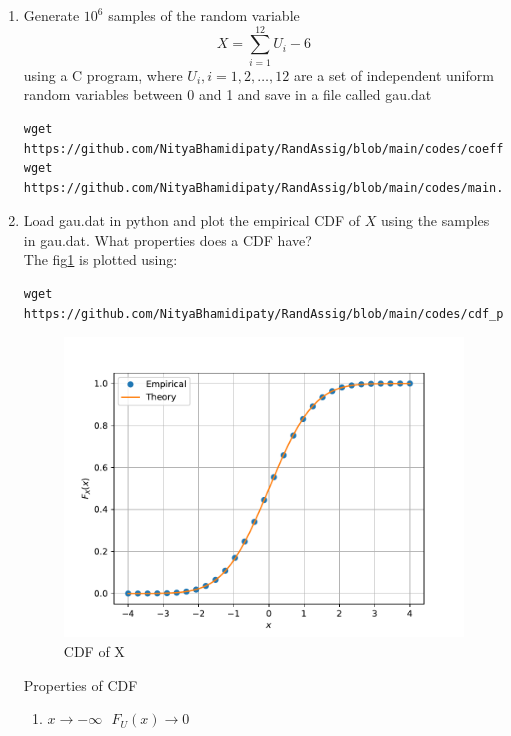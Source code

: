 \documentclass[journal,12pt,twocolumn]{IEEEtran}
\renewcommand\thesection{\arabic{section}}
\begin{document}
\begin{enumerate}[label=\thesection.\arabic*
,ref=\thesection.\theenumi]

%
\item
Generate $10^6$ samples of the random variable
%
\begin{equation}
X = \sum_{i=1}^{12}U_i -6
\end{equation}
%
using a C program, where $U_i, i = 1,2,\dots, 12$ are  a set of independent uniform random variables between 0 and 1
and save in a file called gau.dat
\\
\solution
\begin{lstlisting}
wget https://github.com/NityaBhamidipaty/RandAssig/blob/main/codes/coeffs.h
wget https://github.com/NityaBhamidipaty/RandAssig/blob/main/codes/main.c
\end{lstlisting}
\item
Load gau.dat in python and plot the empirical CDF of $X$ using the samples in gau.dat. What properties does a CDF have?
\\
\solution
The fig\ref{fig:gau_cdf} is plotted using:
\begin{lstlisting}
wget https://github.com/NityaBhamidipaty/RandAssig/blob/main/codes/cdf_plot.py
\end{lstlisting}
\begin{figure}[h]
    \centering
    \includegraphics[width=\columnwidth]{./figs/gau_cdf.pdf}
    \caption{CDF of X}
    \label{fig:gau_cdf}
\end{figure}
Properties of CDF
\begin{enumerate}
    \item $x\rightarrow{-\infty}\text{        } F_U(x) \rightarrow{0}$

\end{enumerate}
\end{enumerate}
\end{document}
